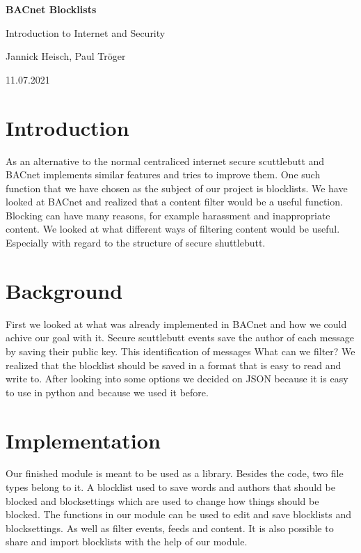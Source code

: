 \documentclass[12pt]{report}
\begin{document}
\begin{titlepage}
\centering
{\LARGE\bfseries BACnet Blocklists}

\vspace{1cm}

{\Large Introduction to Internet and Security}

\vspace{1cm}

{\large Jannick Heisch, Paul Tr\"oger}

\vspace{1cm}

{\large 11.07.2021}

\end{titlepage}

\section{Introduction}
As an alternative to the normal centraliced internet secure scuttlebutt and BACnet implements similar features and tries to improve them. 
One such function that we have chosen as the subject of our project is blocklists.
We have looked at BACnet and realized that a content filter would be a useful function.
Blocking can have many reasons, for example harassment and inappropriate content.
We looked at what different ways of filtering content would be useful. 
Especially with regard to the structure of secure shuttlebutt.

\section{Background}
First we looked at what was already implemented in BACnet and how we could achive our goal with it.
Secure scuttlebutt events save the author of each message by saving their public key.
This identification of messages 
What can we filter?
We realized that the blocklist should be saved in a format that is easy to read and write to.
After looking into some options we decided on JSON because it is easy to use in python 
and because we used it before.

\section{Implementation}
Our finished module is meant to be used as a library.
Besides the code, two file types belong to it.
A blocklist used to save words and authors that should be blocked and
blocksettings which are used to change how things should be blocked.
The functions in our module can be used to edit and save blocklists and blocksettings.
As well as filter events, feeds and content.
It is also possible to share and import blocklists with the help of our module. 
\end{document}

